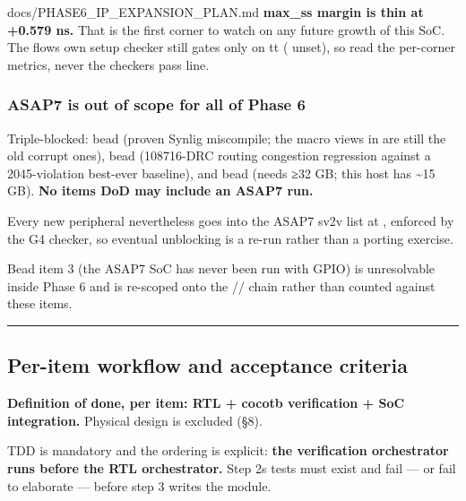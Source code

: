 \begin{relocated}{docs/PHASE6_IP_EXPANSION_PLAN.md}
\warn{} \textbf{max\_ss margin is thin at +0.579 ns.} That is the first
corner to watch on any future growth of this SoC. The
flow\textquotesingle s own setup checker still gates only on tt
( unset), so read the per-corner metrics,
never the checker\textquotesingle s pass line.

\subsubsection{ASAP7 is out of scope for all of Phase 6}\label{ds:ch:phase6-ip-expansion-plan:asap7-is-out-of-scope-for-all-of-phase-6}

Triple-blocked: bead  (proven Synlig 
miscompile; the macro views in  are still the
old corrupt ones), bead  (108716-DRC routing congestion
regression against a 2045-violation best-ever baseline), and bead
 (needs ≥32 GB; this host has \textasciitilde15 GB).
\textbf{No item\textquotesingle s DoD may include an ASAP7 run.}

Every new peripheral nevertheless goes into the ASAP7 sv2v list at
, enforced by the G4 checker, so eventual
unblocking is a re-run rather than a porting exercise.

Bead  item 3 (the ASAP7 SoC has never been run with GPIO) is
unresolvable inside Phase 6 and is re-scoped onto the
// chain rather than counted against these
items.

\begin{center}\rule{0.5\linewidth}{0.5pt}\end{center}

\subsection{Per-item workflow and acceptance criteria}\label{ds:ch:phase6-ip-expansion-plan:9-per-item-workflow-and-acceptance-criteria}

\textbf{Definition of done, per item: RTL + cocotb verification + SoC
integration.} Physical design is excluded (§8).

TDD is mandatory and the ordering is explicit: \textbf{the verification
orchestrator runs before the RTL orchestrator.} Step 2\textquotesingle s
tests must exist and fail --- or fail to elaborate --- before step 3
writes the module.

{\footnotesize\setlength{\tabcolsep}{3pt}

}
\end{relocated}
